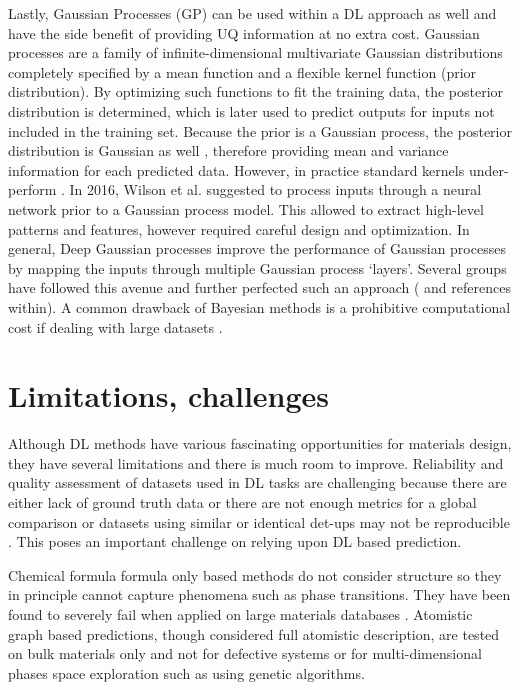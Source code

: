\documentclass[pdflatex,sn-mathphys]{sn-jnl}%
\theoremstyle{thmstyleone}%
\theoremstyle{thmstyletwo}%
\theoremstyle{thmstylethree}%
\begin{document}
Lastly, Gaussian Processes (GP) can be used within a DL approach as well and have the side benefit of providing UQ information at no extra cost. Gaussian processes are a family of infinite-dimensional multivariate Gaussian distributions completely specified by a mean function and a flexible kernel function (prior distribution). By optimizing such functions to fit the training data, the posterior distribution is determined, which is later used to predict outputs for inputs not included in the training set. Because the prior is a Gaussian process, the posterior distribution is Gaussian as well \cite{rasmussen2003gaussian}, therefore providing mean and variance information for each predicted data. However, in practice standard kernels under-perform \cite{hegde2018deep}. In 2016, Wilson et al. \cite{wilson2016deep} suggested to process inputs through a neural network prior to a Gaussian process model. This allowed to extract high-level patterns and features, however required careful design and optimization. In general, Deep Gaussian processes improve the performance of Gaussian processes by mapping the inputs through multiple Gaussian process `layers'. Several groups have followed this avenue and further perfected such an approach (\cite{hegde2018deep} and references within). A common drawback of Bayesian methods is a prohibitive computational cost if dealing with large datasets \cite{gal2016dropout}.

\section{Limitations, challenges}\label{sec:challenges}
 
Although DL methods have various fascinating opportunities for materials design, they have several limitations and there is much room to improve. Reliability and quality assessment of datasets used in DL tasks are challenging because there are either lack of ground truth data or there are not enough metrics for a global comparison or datasets using similar or identical det-ups may not be reproducible \cite{hegde2020reproducibility}. This poses an important challenge on relying upon DL based prediction. 

Chemical formula formula only based methods do not consider structure so they in principle cannot capture phenomena such as phase transitions. They have been found to severely fail when applied on large materials databases \cite{bartel2020critical}. Atomistic graph based predictions, though considered full atomistic description, are tested on bulk materials only and not for defective systems or for multi-dimensional phases space exploration such as using genetic algorithms. 
\end{document}

